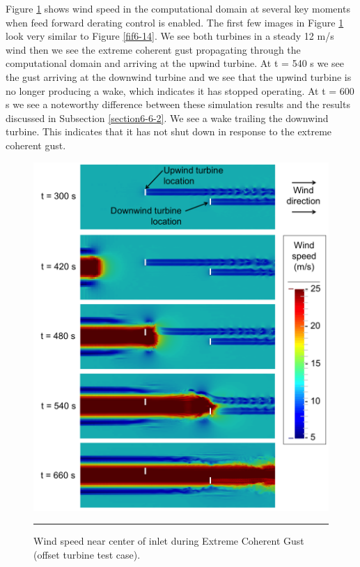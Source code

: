 Figure \ref{fig6-20} shows wind speed in the computational domain at several key moments when feed forward derating control is enabled. The first few images in Figure \ref{fig6-20} look very similar to Figure \ref{fif6-14}. We see both turbines in a steady 12 m/s wind then we see the extreme coherent gust propagating through the computational domain and arriving at the upwind turbine. At t = 540 s we see the gust arriving at the downwind turbine and we see that the upwind turbine is no longer producing a wake, which indicates it has stopped operating. At t = 600 s we see a noteworthy difference between these simulation results and the results discussed in Subsection \ref{section6-6-2}. We see a wake trailing the downwind turbine. This indicates that it has not shut down in response to the extreme coherent gust.

 \begin{figure}[htbp] \label{fig6-20} 
	\centering
		\includegraphics[width = \linewidth]{Figures/ch6Figures/fig6-20.png}
		\rule{35em}{0.5pt}
	\caption{Wind speed near center of inlet during Extreme Coherent Gust (offset turbine test case).}
\end{figure}

